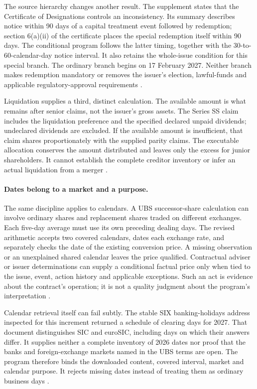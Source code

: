 The source hierarchy changes another result. The supplement states that the
Certificate of Designations controls an inconsistency. Its summary describes
notice within 90 days of a capital treatment event followed by redemption;
section 6(a)(ii) of the certificate places the special redemption itself within
90 days. The conditional program follows the latter timing, together with
the 30-to-60-calendar-day notice interval. It also retains the whole-issue
condition for this special branch. The ordinary branch begins on 17 February
2027. Neither branch makes redemption mandatory or removes the issuer's
election, lawful-funds and applicable regulatory-approval requirements
\citep[pp.~S-16, S-19--S-20]{bofass2022}
\citep[sections~6(a)--(b)]{bofasscertificate2022}.

Liquidation supplies a third, distinct calculation. The available amount is
what remains after senior claims, not the issuer's gross assets. The Series SS
claim includes the liquidation preference and the specified declared unpaid
dividends; undeclared dividends are excluded. If the available amount is
insufficient, that claim shares proportionately with the supplied parity
claims. The executable allocation conserves the amount distributed and leaves
only the excess for junior shareholders. It cannot establish the complete
creditor inventory or infer an actual liquidation from a merger
\citep[p.~S-19]{bofass2022}.

\paragraph{Dates belong to a market and a purpose.}
The same discipline applies to calendars. A UBS successor-share calculation
can involve ordinary shares and replacement shares traded on different
exchanges. Each five-day average must use its own preceding dealing days.
The revised arithmetic accepts two covered calendars, dates each exchange
rate, and separately checks the date of the existing conversion price.
A missing observation or an unexplained shared calendar leaves the price
qualified. Contractual adviser or issuer determinations can supply a
conditional factual price only when tied to the issue, event, action history
and applicable exceptions. Such an act is evidence about the contract's
operation; it is not a quality judgment about the program's interpretation
\citep[conditions~8(d)--(e), 8(m)--(n)]{ubsat12024}.

Calendar retrieval itself can fail subtly. The stable SIX banking-holidays
address inspected for this increment returned a schedule of clearing days
for 2027. That document distinguishes SIC and euroSIC, including days on
which their answers differ. It supplies neither a complete inventory of
2026 dates nor proof that the banks and foreign-exchange markets named in
the UBS terms are open. The program therefore binds the downloaded content,
covered interval, market and calendar purpose. It rejects missing dates
instead of treating them as ordinary business days
\citep[one-page schedule]{sixclearing2027}.

